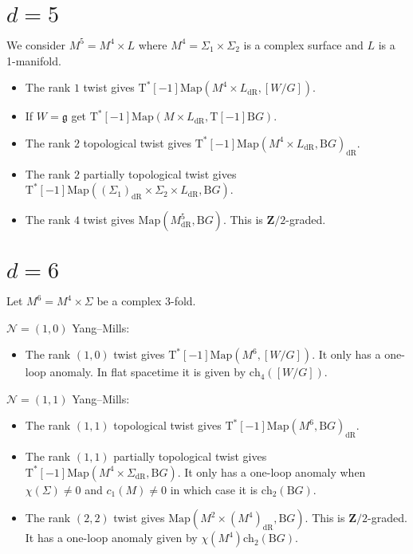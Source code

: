 \documentclass[12pt]{amsart}
\newcommand{\B}{\mathrm{B}}
\newcommand{\g}{\mathfrak{g}}
\newcommand{\cN}{\mathcal{N}}
\newcommand{\T}{\mathrm{T}}
\newcommand{\Z}{\mathbf{Z}}
\newcommand{\ch}{\mathrm{ch}}
\newcommand{\dR}{\mathrm{dR}}
\newcommand{\Map}{\mathrm{Map}}
\theoremstyle{definition}
\theoremstyle{remark}
\begin{document}
\section{$d=5$}

We consider $M^5=M^4\times L$ where $M^4=\Sigma_1\times \Sigma_2$ is a complex surface and $L$ is a 1-manifold.

\begin{itemize}
\item The rank $1$ twist gives $\T^*[-1]\Map(M^4\times L_{\dR}, [W/G])$.

\item If $W=\g$ get $\T^*[-1]\Map(M\times L_{\dR}, \T[-1]\B G)$.

\item The rank $2$ topological twist gives $\T^*[-1]\Map(M^4\times L_{\dR}, \B G)_{\dR}$.

\item The rank $2$ partially topological twist gives $\T^*[-1]\Map((\Sigma_1)_{\dR}\times \Sigma_2\times L_{\dR}, \B G)$.

\item The rank $4$ twist gives $\Map(M^5_{\dR}, \B G)$. This is $\Z/2$-graded.
\end{itemize}

\section{$d=6$}

Let $M^6=M^4\times \Sigma$ be a complex 3-fold.

$\cN=(1, 0)$ Yang--Mills:
\begin{itemize}
\item The rank $(1, 0)$ twist gives $\T^*[-1]\Map(M^6, [W/G])$. It only has a one-loop anomaly. In flat spacetime it is given by $\ch_4([W/G])$.
\end{itemize}

$\cN=(1, 1)$ Yang--Mills:
\begin{itemize}
\item The rank $(1, 1)$ topological twist gives $\T^*[-1]\Map(M^6, \B G)_{\dR}$.

\item The rank $(1, 1)$ partially topological twist gives $\T^*[-1]\Map(M^4\times \Sigma_{\dR}, \B G)$. It only has a one-loop anomaly when $\chi(\Sigma)\neq 0$ and $c_1(M)\neq 0$ in which case it is $\ch_2(\B G)$.

\item The rank $(2, 2)$ twist gives $\Map(M^2\times (M^4)_{\dR}, \B G)$. This is $\Z/2$-graded. It has a one-loop anomaly given by $\chi(M^4) \ch_2(\B G)$.
\end{itemize}
\end{document}
